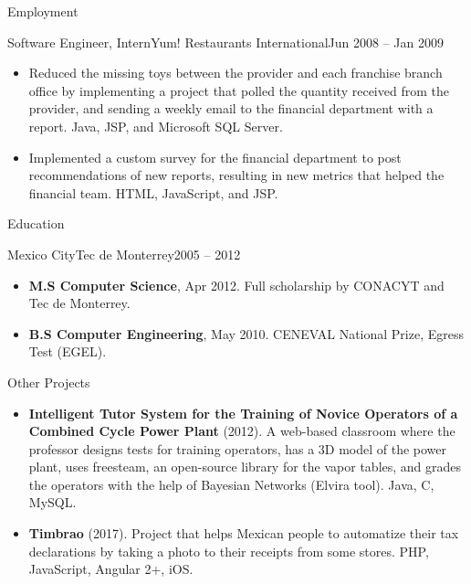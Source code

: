 \documentclass[calibri]{../mcdowell-cv/mcdowellcv}
\begin{document}
\begin{cvsection}{Employment}
		\begin{cvsubsection}{Software Engineer, Intern}{Yum! Restaurants International}{Jun 2008 -- Jan 2009}
			\begin{itemize}
				\item Reduced the missing toys between the provider and each franchise branch office by implementing a project that polled the quantity received from the provider, and sending a weekly email to the financial department with a report. Java, JSP, and Microsoft SQL Server.
				\item Implemented a custom survey for the financial department to post recommendations of new reports, resulting in new metrics that helped the financial team. HTML, JavaScript, and JSP.
			\end{itemize}
		\end{cvsubsection}
	\end{cvsection}

	\begin{cvsection}{Education}
		\begin{cvsubsection}{Mexico City}{Tec de Monterrey}{2005 -- 2012}
			\begin{itemize}
				\item \textbf{M.S Computer Science}, Apr 2012. Full scholarship by CONACYT and Tec de Monterrey.
				\item \textbf{B.S Computer Engineering}, May 2010. CENEVAL National Prize, Egress Test (EGEL).
			\end{itemize}
		\end{cvsubsection}
	\end{cvsection}
	
	\begin{cvsection}{Other Projects}
		\begin{cvsubsection}{}{}{}	
			\begin{itemize}
				\item \textbf{Intelligent Tutor System for the Training of Novice Operators of a Combined Cycle Power Plant} (2012). A web-based classroom where the professor designs tests for training operators, has a 3D model of the power plant, uses freesteam, an open-source library for the vapor tables, and grades the operators with the help of Bayesian Networks (Elvira tool). Java, C, MySQL.
				\item \textbf{Timbrao} (2017). Project that helps Mexican people to automatize their tax declarations by taking a photo to their receipts from some stores. PHP, JavaScript, Angular 2+, iOS.
			\end{itemize}
		\end{cvsubsection}
	\end{cvsection}
	
\end{document}
